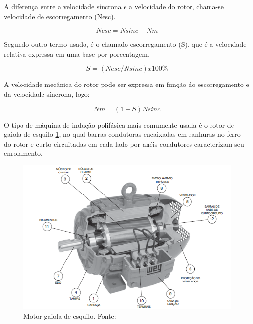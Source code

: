 A diferença entre a velocidade síncrona e a velocidade do rotor, chama-se velocidade de escorregamento (Nesc). \cite{chapman}

    \begin{equation}\label{Velocidade de Escorregamento .}
            Nesc=Nsinc-Nm
    \end{equation}
    

Segundo \cite{chapman} outro termo usado, é o chamado escorregamento (S), que é a velocidade relativa expressa em uma base por porcentagem.
  
  
  \begin{equation}\label{Escorregamento S}
           S=(Nesc/Nsinc) x 100\%
    \end{equation}

A velocidade mecânica do rotor pode ser expressa em função do escorregamento e da velocidade síncrona, logo:


  \begin{equation}\label{Velocidade Mecânica do Rotor}
         Nm=(1-S)Nsinc
    \end{equation}

O tipo de máquina de indução polifásica mais comumente usada é o rotor de gaiola de esquilo \ref{fig:motor}, no qual barras condutoras encaixadas em ranhuras no ferro do rotor e curto-circuitadas em cada lado por anéis condutores caracterizam seu enrolamento. \cite{Fitzgerald}

\begin{figure}[!ht]
\centering
\includegraphics[keepaspectratio=true,scale=0.8]{figuras/motor.png}
\caption{Motor gaiola de esquilo. Fonte:\cite{WEG}}
\label{fig:motor}

\end{figure}

